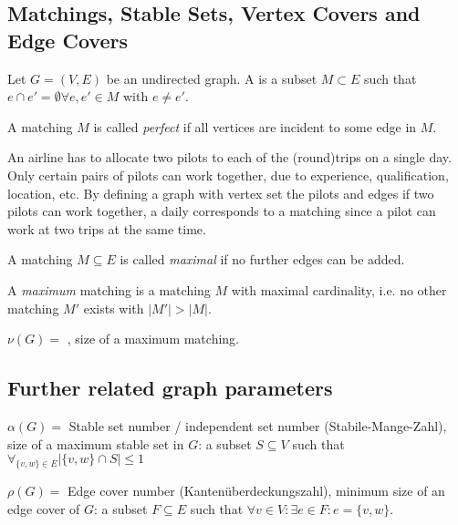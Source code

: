 \begin{lec}[2011-10-31]\end{lec}

\subsection*{Matchings, Stable Sets, Vertex Covers and Edge Covers}


\begin{defn}
Let $G = (V, E)$ be an undirected graph. A  is a
subset $M \subset E$ such that $e \cap e' = \emptyset \forall e, e' \in M$
with $e \neq e'$.

A matching $M$ is called \emph{perfect} if all vertices are incident to
some edge in $M$.
\end{defn}

\begin{xmp+}
An airline has to allocate two pilots to each of the (round)trips on a
single day. Only certain pairs of pilots can work together, due to
experience, qualification, location, etc. By defining a graph with vertex
set the pilots and edges if two pilots can work together, a daily
corresponds to a matching since a pilot can work at two trips at the same
time.
\end{xmp+}

\begin{defn}
A matching $M \subseteq E$ is called \emph{maximal} if no further edges can
be added.

A \emph{maximum} matching is a matching $M$ with maximal cardinality, i.e.
no other matching $M'$ exists with $|M'| > |M|$.

$\nu(G) =$ , size of a maximum matching.
\end{defn}

\subsection*{Further related graph parameters}
$\alpha(G) = $ Stable set number / independent set number (Stabile-Mange-Zahl), size of a maximum stable set in
$G$: a subset $S \subseteq V$ such that $\forall_{\{v, w\} \in E} \left|
\{v, w\} \cap S \right| \leq 1$

$\rho(G) = $ Edge cover number (Kantenüberdeckungszahl), minimum size of an
edge cover of $G$: a subset $F \subseteq E$ such that $\forall v \in V:
\exists e \in F: e = \{ v, w \}$.

